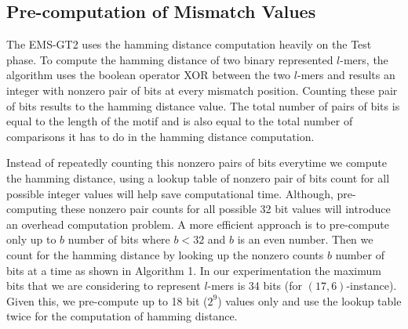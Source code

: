 \subsection{Pre-computation of Mismatch Values}
The EMS-GT2 uses the hamming distance computation heavily on the Test phase. To compute the hamming distance of two binary represented $l$-mers, the algorithm uses the boolean operator XOR between the two $l$-mers and results an integer with nonzero pair of bits at every mismatch position. Counting these pair of bits results to the hamming distance value. The total number of pairs of bits is equal to the length of the motif and is also equal to the total number of comparisons it has to do in the hamming distance computation. 

Instead of repeatedly counting this nonzero pairs of bits everytime we compute the hamming distance, using a lookup table of nonzero pair of bits count for all possible integer values will help save computational time. Although, pre-computing these nonzero pair counts for all possible 32 bit values will introduce an overhead computation problem. A more efficient approach is to pre-compute only up to $b$ number of bits where $b < 32$ and $b$ is an even number. Then we count for the hamming distance by looking up the nonzero counts $b$ number of bits at a time as shown in Algorithm 1. In our experimentation the maximum bits that we are considering to represent $l$-mers is 34 bits (for $(17, 6)$-instance). Given this, we pre-compute up to 18 bit ($2^9$) values only and use the lookup table twice for the computation of hamming distance.

 






